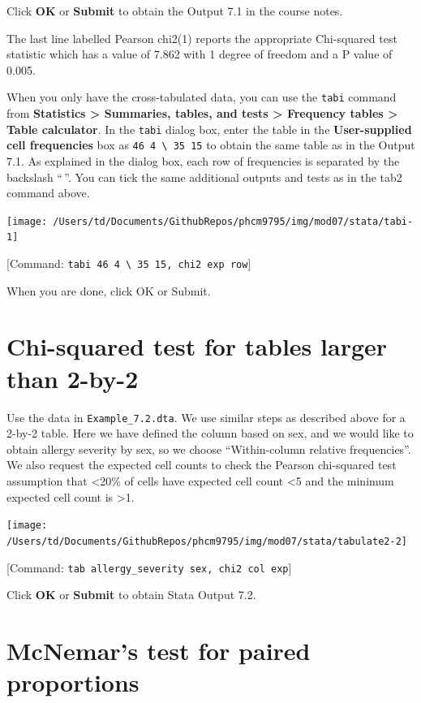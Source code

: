 \documentclass[
]{memoir}
\begin{document}
Click \textbf{OK} or \textbf{Submit} to obtain the Output 7.1 in the course notes.

The last line labelled Pearson chi2(1) reports the appropriate Chi-squared test statistic which has a value of 7.862 with 1 degree of freedom and a P value of 0.005.

When you only have the cross-tabulated data, you can use the \texttt{tabi} command from \textbf{Statistics \textgreater{} Summaries, tables, and tests \textgreater{} Frequency tables \textgreater{} Table calculator}. In the \texttt{tabi} dialog box, enter the table in the \textbf{User-supplied cell frequencies} box as \texttt{46\ 4\ \textbackslash{}\ 35\ 15} to obtain the same table as in the Output 7.1. As explained in the dialog box, each row of frequencies is separated by the backslash ``\,''. You can tick the same additional outputs and tests as in the tab2 command above.

\texttt{[image: /Users/td/Documents/GithubRepos/phcm9795/img/mod07/stata/tabi-1]}

{[}Command: \texttt{tabi\ 46\ 4\ \textbackslash{}\ 35\ 15,\ chi2\ exp\ row}{]}

When you are done, click OK or Submit.

\hypertarget{chi-squared-test-for-tables-larger-than-2-by-2}{%
\section{Chi-squared test for tables larger than 2-by-2}\label{chi-squared-test-for-tables-larger-than-2-by-2}}

Use the data in \texttt{Example\_7.2.dta}. We use similar steps as described above for a 2-by-2 table. Here we have defined the column based on sex, and we would like to obtain allergy severity by sex, so we choose ``Within-column relative frequencies''. We also request the expected cell counts to check the Pearson chi-squared test assumption that \textless20\% of cells have expected cell count \textless5 and the minimum expected cell count is \textgreater1.

\texttt{[image: /Users/td/Documents/GithubRepos/phcm9795/img/mod07/stata/tabulate2-2]}

{[}Command: \texttt{tab\ allergy\_severity\ sex,\ chi2\ col\ exp}{]}

Click \textbf{OK} or \textbf{Submit} to obtain Stata Output 7.2.

\hypertarget{mcnemars-test-for-paired-proportions}{%
\section{McNemar's test for paired proportions}\label{mcnemars-test-for-paired-proportions}}
\end{document}
